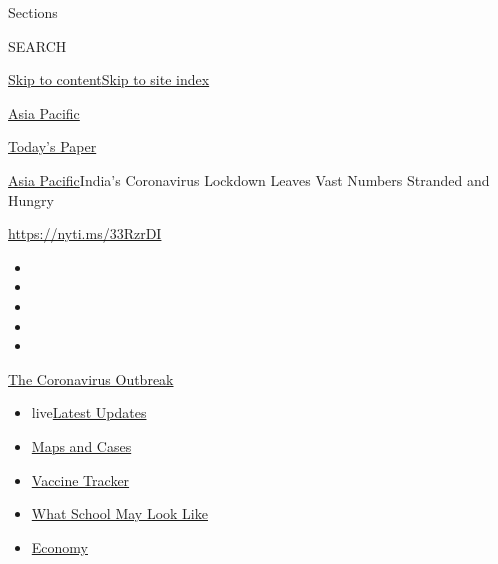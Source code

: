 Sections

SEARCH

\protect\hyperlink{site-content}{Skip to
content}\protect\hyperlink{site-index}{Skip to site index}

\href{https://www.nytimes.com/section/world/asia}{Asia Pacific}

\href{https://myaccount.nytimes.com/auth/login?response_type=cookie\&client_id=vi}{}

\href{https://www.nytimes.com/section/todayspaper}{Today's Paper}

\href{/section/world/asia}{Asia Pacific}\textbar{}India's Coronavirus
Lockdown Leaves Vast Numbers Stranded and Hungry

\url{https://nyti.ms/33RzrDI}

\begin{itemize}
\item
\item
\item
\item
\item
\end{itemize}

\href{https://www.nytimes.com/news-event/coronavirus?action=click\&pgtype=Article\&state=default\&region=TOP_BANNER\&context=storylines_menu}{The
Coronavirus Outbreak}

\begin{itemize}
\tightlist
\item
  live\href{https://www.nytimes.com/2020/08/02/world/coronavirus-updates.html?action=click\&pgtype=Article\&state=default\&region=TOP_BANNER\&context=storylines_menu}{Latest
  Updates}
\item
  \href{https://www.nytimes.com/interactive/2020/us/coronavirus-us-cases.html?action=click\&pgtype=Article\&state=default\&region=TOP_BANNER\&context=storylines_menu}{Maps
  and Cases}
\item
  \href{https://www.nytimes.com/interactive/2020/science/coronavirus-vaccine-tracker.html?action=click\&pgtype=Article\&state=default\&region=TOP_BANNER\&context=storylines_menu}{Vaccine
  Tracker}
\item
  \href{https://www.nytimes.com/interactive/2020/07/29/us/schools-reopening-coronavirus.html?action=click\&pgtype=Article\&state=default\&region=TOP_BANNER\&context=storylines_menu}{What
  School May Look Like}
\item
  \href{https://www.nytimes.com/live/2020/07/31/business/stock-market-today-coronavirus?action=click\&pgtype=Article\&state=default\&region=TOP_BANNER\&context=storylines_menu}{Economy}
\end{itemize}

